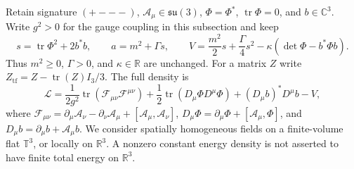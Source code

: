 Retain signature $(+---)$, $\mathcal A_\mu\in\mathfrak{su}(3)$,
$\Phi=\Phi^*$, $\operatorname{tr}\Phi=0$, and $b\in\mathbb C^3$.
Write $g^2>0$ for the gauge coupling in this subsection and keep
\[
 s=\operatorname{tr}\Phi^2+2b^*b,\qquad
 a=m^2+\Gamma s,\qquad
 V=\frac{m^2}{2}s+\frac{\Gamma}{4}s^2-\kappa(\det\Phi-b^*\Phi b).
\]
Thus $m^2\geq0$, $\Gamma>0$, and $\kappa\in\mathbb R$ are unchanged.
For a matrix $Z$ write
$Z_{\mathrm{tf}}=Z-\operatorname{tr}(Z)I_3/3$. The full density is
\begin{equation}\label{q444:full-gauge-density}
 \mathcal L=\frac1{2g^2}\operatorname{tr}
 (\mathcal F_{\mu\nu}\mathcal F^{\mu\nu})
 +\frac12\operatorname{tr}(D_\mu\Phi D^\mu\Phi)
 +(D_\mu b)^*D^\mu b-V,
\end{equation}
where $\mathcal F_{\mu\nu}=\partial_\mu\mathcal A_\nu-
\partial_\nu\mathcal A_\mu+[\mathcal A_\mu,\mathcal A_\nu]$,
$D_\mu\Phi=\partial_\mu\Phi+[\mathcal A_\mu,\Phi]$, and
$D_\mu b=\partial_\mu b+\mathcal A_\mu b$.
We consider spatially homogeneous fields on a finite-volume flat
$\mathbb T^3$, or locally on $\mathbb R^3$. A nonzero constant energy
density is not asserted to have finite total energy on $\mathbb R^3$.

